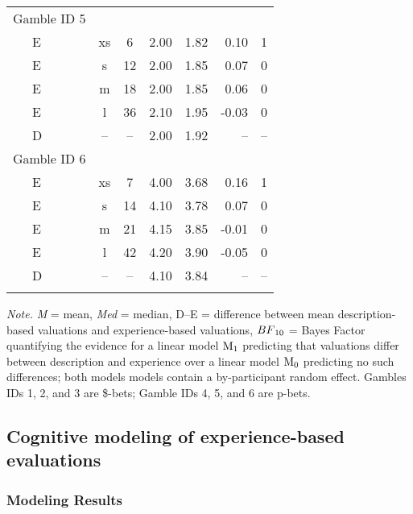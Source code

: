 \documentclass[a4paper, man, floatsintext]{apa6}
\begin{document}
\begin{table}[tbp]
\begin{center}
\begin{threeparttable}
\begin{tabular}{lccccrr}
Gamble ID 5 &  &  &  &  &  & \\
\ \ \ E & xs & 6 & 2.00 & 1.82 & 0.10 & 1\\
\ \ \ E & s & 12 & 2.00 & 1.85 & 0.07 & 0\\
\ \ \ E & m & 18 & 2.00 & 1.85 & 0.06 & 0\\
\ \ \ E & l & 36 & 2.10 & 1.95 & -0.03 & 0\\
\ \ \ D & -- & -- & 2.00 & 1.92 & -- & --\\
Gamble ID 6 &  &  &  &  &  & \\
\ \ \ E & xs & 7 & 4.00 & 3.68 & 0.16 & 1\\
\ \ \ E & s & 14 & 4.10 & 3.78 & 0.07 & 0\\
\ \ \ E & m & 21 & 4.15 & 3.85 & -0.01 & 0\\
\ \ \ E & l & 42 & 4.20 & 3.90 & -0.05 & 0\\
\ \ \ D & -- & -- & 4.10 & 3.84 & -- & --\\
\bottomrule
\addlinespace
\end{tabular}

\begin{tablenotes}[para]
\normalsize{\textit{Note.} \textit{M} = mean, \textit{Med} = median, D--E = difference between mean description-based valuations and experience-based valuations, $BF\textsubscript{10}$ = Bayes Factor quantifying the evidence for a linear model $\mathrm{M}\textsubscript{1}$ predicting that valuations differ between description and experience over a linear model $\mathrm{M}\textsubscript{0}$ predicting no such differences; both models models contain a by-participant random effect. Gambles IDs 1, 2, and 3 are \$-bets; Gamble IDs 4, 5, and 6 are p-bets.}
\end{tablenotes}

\end{threeparttable}
\end{center}

\end{table}

\subsection{Cognitive modeling of experience-based evaluations}

\subsubsection{Modeling Results}
\end{document}
